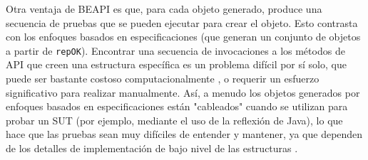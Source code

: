 Otra ventaja de \textsf{BEAPI} es que, para cada objeto generado, produce una secuencia de pruebas que se pueden ejecutar para crear el objeto. Esto contrasta con los enfoques basados en especificaciones (que generan un conjunto de objetos a partir de \texttt{repOK}). Encontrar una secuencia de invocaciones a los métodos de API que creen una estructura específica es un problema difícil por sí solo, que puede ser bastante costoso computacionalmente \cite{Braione17}, o requerir un esfuerzo significativo para realizar manualmente. Así, a menudo los objetos generados por enfoques basados en especificaciones están "cableados" cuando se utilizan para probar un SUT (por ejemplo, mediante el uso de la reflexión de Java), lo que hace que las pruebas sean muy difíciles de entender y mantener, ya que dependen de los detalles de implementación de bajo nivel de las estructuras \cite{Braione17}.






